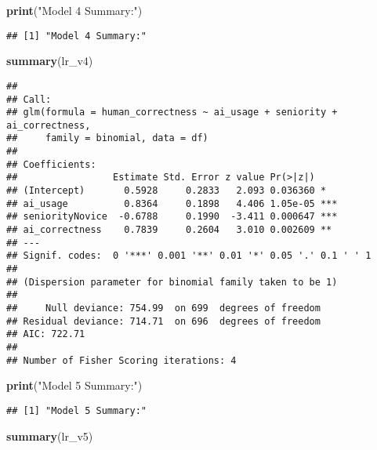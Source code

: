 \documentclass[
]{article}
\newenvironment{Shaded}{\begin{snugshade}}{\end{snugshade}}
\newcommand{\FunctionTok}[1]{\textcolor[rgb]{0.13,0.29,0.53}{\textbf{#1}}}
\newcommand{\NormalTok}[1]{#1}
\newcommand{\StringTok}[1]{\textcolor[rgb]{0.31,0.60,0.02}{#1}}
\begin{document}
\begin{Shaded}
\begin{Highlighting}[]
\FunctionTok{print}\NormalTok{(}\StringTok{"Model 4 Summary:"}\NormalTok{)}
\end{Highlighting}
\end{Shaded}

\begin{verbatim}
## [1] "Model 4 Summary:"
\end{verbatim}

\begin{Shaded}
\begin{Highlighting}[]
\FunctionTok{summary}\NormalTok{(lr\_v4)}
\end{Highlighting}
\end{Shaded}

\begin{verbatim}
## 
## Call:
## glm(formula = human_correctness ~ ai_usage + seniority + ai_correctness, 
##     family = binomial, data = df)
## 
## Coefficients:
##                 Estimate Std. Error z value Pr(>|z|)    
## (Intercept)       0.5928     0.2833   2.093 0.036360 *  
## ai_usage          0.8364     0.1898   4.406 1.05e-05 ***
## seniorityNovice  -0.6788     0.1990  -3.411 0.000647 ***
## ai_correctness    0.7839     0.2604   3.010 0.002609 ** 
## ---
## Signif. codes:  0 '***' 0.001 '**' 0.01 '*' 0.05 '.' 0.1 ' ' 1
## 
## (Dispersion parameter for binomial family taken to be 1)
## 
##     Null deviance: 754.99  on 699  degrees of freedom
## Residual deviance: 714.71  on 696  degrees of freedom
## AIC: 722.71
## 
## Number of Fisher Scoring iterations: 4
\end{verbatim}

\begin{Shaded}
\begin{Highlighting}[]
\FunctionTok{print}\NormalTok{(}\StringTok{"Model 5 Summary:"}\NormalTok{)}
\end{Highlighting}
\end{Shaded}

\begin{verbatim}
## [1] "Model 5 Summary:"
\end{verbatim}

\begin{Shaded}
\begin{Highlighting}[]
\FunctionTok{summary}\NormalTok{(lr\_v5)}
\end{Highlighting}
\end{Shaded}
\end{document}
